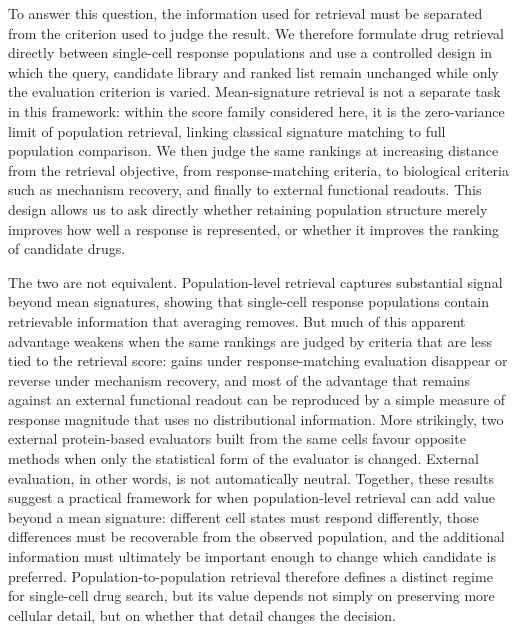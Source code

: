 \documentclass[11pt,letterpaper]{article}
\begin{document}
To answer this question, the information used for retrieval must be separated from the criterion used to judge the result. We therefore formulate drug retrieval directly between single-cell response populations and use a controlled design in which the query, candidate library and ranked list remain unchanged while only the evaluation criterion is varied. Mean-signature retrieval is not a separate task in this framework: within the score family considered here, it is the zero-variance limit of population retrieval, linking classical signature matching to full population comparison. We then judge the same rankings at increasing distance from the retrieval objective, from response-matching criteria, to biological criteria such as mechanism recovery, and finally to external functional readouts\cite{GDSC,GDSCLandscape}. This design allows us to ask directly whether retaining population structure merely improves how well a response is represented, or whether it improves the ranking of candidate drugs.

The two are not equivalent. Population-level retrieval captures substantial signal beyond mean signatures, showing that single-cell response populations contain retrievable information that averaging removes. But much of this apparent advantage weakens when the same rankings are judged by criteria that are less tied to the retrieval score: gains under response-matching evaluation disappear or reverse under mechanism recovery, and most of the advantage that remains against an external functional readout can be reproduced by a simple measure of response magnitude that uses no distributional information. More strikingly, two external protein-based evaluators built from the same cells favour opposite methods when only the statistical form of the evaluator is changed. External evaluation, in other words, is not automatically neutral. Together, these results suggest a practical framework for when population-level retrieval can add value beyond a mean signature: different cell states must respond differently, those differences must be recoverable from the observed population, and the additional information must ultimately be important enough to change which candidate is preferred. Population-to-population retrieval therefore defines a distinct regime for single-cell drug search, but its value depends not simply on preserving more cellular detail, but on whether that detail changes the decision.



\end{document}
